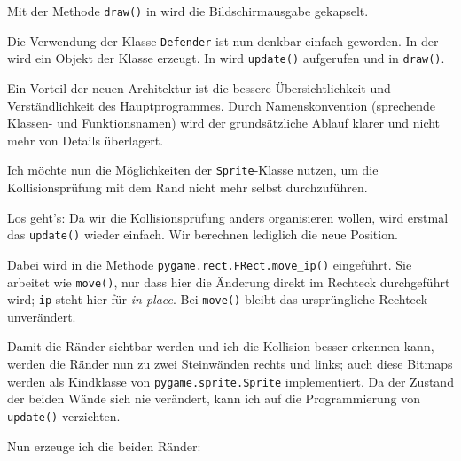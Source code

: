 Mit der Methode \texttt{draw()} in  wird die Bildschirmausgabe gekapselt.


Die Verwendung der Klasse \texttt{Defender} ist nun denkbar einfach geworden. In der  wird ein Objekt der Klasse erzeugt. In  wird \texttt{update()} aufgerufen und in  \texttt{draw()}.

Ein Vorteil der neuen Architektur ist die bessere Übersichtlichkeit und Verständlichkeit des Hauptprogrammes. Durch Namenskonvention (sprechende Klassen- und Funktionsnamen) wird der grundsätzliche Ablauf klarer und nicht mehr von Details überlagert.


Ich möchte nun die Möglichkeiten der \texttt{Sprite}-Klasse nutzen, um die Kollisionsprüfung mit dem Rand nicht mehr selbst durchzuführen. 


Los geht's: Da wir die Kollisionsprüfung anders organisieren wollen, wird erstmal das \texttt{update()} wieder einfach. Wir berechnen lediglich die neue Position. 

Dabei wird in  die Methode \texttt{pygame.rect.FRect.move\_ip()} eingeführt. Sie arbeitet wie \texttt{move()}, nur dass hier die Änderung direkt im Rechteck durchgeführt wird; \texttt{ip} steht hier für \emph{in place}. Bei \texttt{move()} bleibt das ursprüngliche Rechteck unverändert.



Damit die Ränder sichtbar werden und ich die Kollision besser erkennen kann, werden die Ränder nun zu zwei Steinwänden rechts und links; auch diese Bitmaps werden als Kindklasse von \texttt{pygame.sprite.Sprite} implementiert. Da der Zustand der beiden Wände sich nie verändert, kann ich auf die Programmierung von \texttt{update()} verzichten.


Nun erzeuge ich die beiden Ränder:


